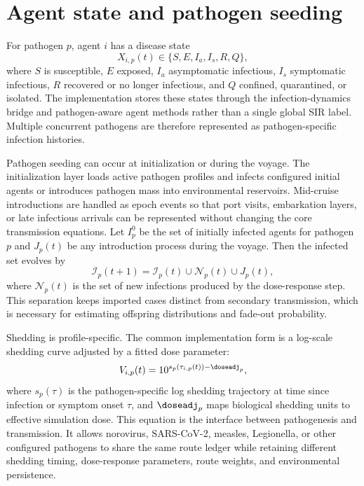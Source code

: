 \section{Agent state and pathogen seeding}
For pathogen $p$, agent $i$ has a disease state
\begin{equation}
X_{i,p}(t)\in\{S,E,I_{a},I_{s},R,Q\},
\end{equation}
where $S$ is susceptible, $E$ exposed, $I_a$ asymptomatic infectious, $I_s$ symptomatic infectious, $R$ recovered or no longer infectious, and $Q$ confined, quarantined, or isolated. The
implementation stores these states through the infection-dynamics bridge and pathogen-aware agent methods rather than a single global SIR label. Multiple concurrent pathogens are therefore
represented as pathogen-specific infection histories.

Pathogen seeding can occur at initialization or during the voyage. The initialization layer loads active pathogen profiles and infects configured initial agents or introduces pathogen mass
into environmental reservoirs. Mid-cruise introductions are handled as epoch events so that port visits, embarkation layers, or late infectious arrivals can be represented without changing
the core transmission equations. Let $I_{p}^{0}$ be the set of initially infected agents for pathogen $p$ and $J_p(t)$ be any introduction process during the voyage. Then the infected set
evolves by
\begin{equation}
\mathcal{I}_{p}(t+1)=\mathcal{I}_{p}(t)\cup \mathcal{N}_{p}(t)\cup J_p(t),
\end{equation}
where $\mathcal{N}_{p}(t)$ is the set of new infections produced by the dose-response step. This separation keeps imported cases distinct from secondary transmission, which is necessary for
estimating offspring distributions and fade-out probability.

Shedding is profile-specific. The common implementation form is a log-scale shedding curve adjusted by a fitted dose parameter:
\begin{equation}
V_{i,p}(t)=10^{s_p(\tau_{i,p}(t))-\doseadj_p},
\end{equation}
where $s_p(\tau)$ is the pathogen-specific log shedding trajectory at time since infection or symptom onset $\tau$, and $\doseadj_p$ maps biological shedding units to effective simulation
dose. This equation is the interface between pathogenesis and transmission. It allows norovirus, SARS-CoV-2, measles, Legionella, or other configured pathogens to share the same route ledger
while retaining different shedding timing, dose-response parameters, route weights, and environmental persistence.

